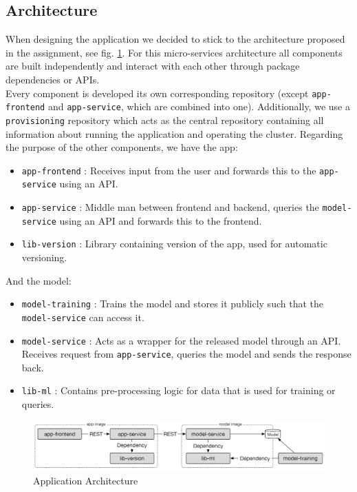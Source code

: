 \subsection{Architecture}
When designing the application we decided to stick to the architecture proposed in the assignment, see fig. {\color{red}\ref{fig:architecture}}.
For this micro-services architecture all components are built independently and interact with each other through package dependencies or APIs. \\
Every component is developed its own corresponding repository (except \texttt{app-frontend} and \texttt{app-service}, which are combined into one). Additionally, we use a \texttt{provisioning} repository which acts as the central repository containing all information about running the application and operating the cluster.
Regarding the purpose of the other components, we have the app:
\begin{itemize}
    \item \texttt{app-frontend} : Receives input from the user and forwards this to the \texttt{app-service} using an API.
    \item \texttt{app-service} : Middle man between frontend and backend, queries the \texttt{model-service} using an API and forwards this to the frontend.
    \item \texttt{lib-version} : Library containing version of the app, used for automatic versioning.
\end{itemize}

And the model:
\begin{itemize}
    \item \texttt{model-training} : Trains the model and stores it publicly such that the \texttt{model-service} can access it.
    \item \texttt{model-service} : Acts as a wrapper for the released model through an API. Receives request from \texttt{app-service}, queries the model and sends the response back.
    \item \texttt{lib-ml} : Contains pre-processing logic for data that is used for training or queries.
\end{itemize}

\begin{figure}
    \centering
    \includegraphics[width=1\linewidth]{images/architecture.png}
    \caption{Application Architecture}
    \label{fig:architecture}
\end{figure}